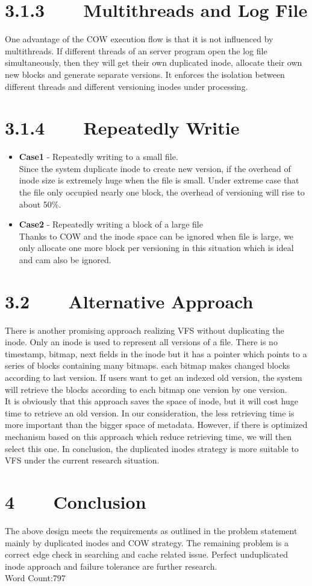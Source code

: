 \section*{3.1.3~~~~Multithreads and Log File}
One advantage of the COW execution flow is that it is not influenced by multithreads. If different threads of an server program open the log file simultaneously, then they will get their own duplicated inode, allocate their own new blocks and generate separate versions. It enforces the isolation between different threads and different versioning inodes under processing.
\section*{3.1.4~~~~Repeatedly Writie}
\begin{itemize}
\item \textbf{Case1} -  Repeatedly writing to a small file. \\
Since the system duplicate inode to create new version, if the overhead of inode size is extremely huge when the file is small. Under extreme case that the file only occupied nearly one block, the overhead of versioning will rise to about 50\%.  
\item \textbf{Case2} -  Repeatedly writing a block of a large file\\
Thanks to COW and the inode space can be ignored when file is large, we only allocate one more block per versioning in this situation which is ideal and cam also be ignored.
\end{itemize}
\section*{3.2~~~~Alternative Approach}
There is another promising approach realizing VFS without duplicating the inode. Only an inode is used to represent all versions of a file. There is no timestamp, bitmap, next fields in the inode but it has a pointer which points to a series of blocks containing many bitmaps. each bitmap makes changed blocks according to last version. If users want to get an indexed old version, the system will retrieve the blocks according to each bitmap one version by one version.\\[1em]
It is obviously that this approach saves the space of inode, but it will cost huge time to retrieve an old version. In our consideration, the less retrieving time is more important than the bigger space of metadata. However, if there is optimized mechanism based on this approach which reduce retrieving time, we will then select this one. In conclusion, the duplicated inodes strategy is more suitable to VFS under the current research situation.   
\section*{4~~~~Conclusion}
The above design meets the requirements as outlined in the problem statement mainly by duplicated inodes and COW strategy. The remaining problem is a correct edge check in searching and cache related issue. Perfect unduplicated inode approach and failure tolerance are further research. \\[15em]

Word Count:797

